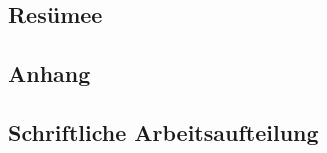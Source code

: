 \documentclass[12pt,a4paper,titlepage,listof=totoc,bibliography=totoc,chapteratlists=0pt]{scrreprt}
\begin{document}
\begin{spacing}{1}
    \chapter{Resümee}
\end{spacing}


\begin{spacing}{1}
    \chapter{Anhang}
\end{spacing}

\begin{spacing}{1}
    \chapter{Schriftliche Arbeitsaufteilung}
\end{spacing}



\setcounter{page}{\value{RPages}}

\glsnogroupskiptrue
\printglossary[title=Glossar,toctitle=Glossar] %
\listoffigures
\listoftables
\lstlistoflistings
\appendix
\newpage
{}
\end{document}
